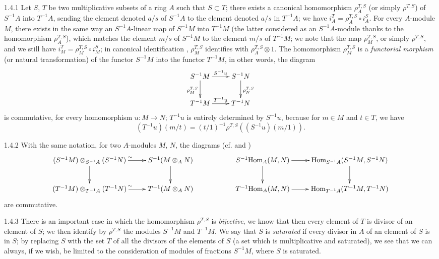 \documentclass[10pt,oneside]{book}
\begin{document}
\begin{env}{1.4.1}
\label{env-0.1.4.1}
Let $S$, $T$ be two multiplicative subsets of a ring $A$ such that $S\subset T$; there exists a canonical
homomorphism $\rho_A^{T,S}$ (or simply $\rho^{T,S}$) of $S^{-1}A$ into  $T^{-1}A$, sending the
element denoted $a/s$ of $S^{-1}A$ to the element denoted $a/s$ in $T^{-1}A$; we have
${i_A^T=\rho_A^{T,S}\circ i_A^S}$. For every $A$-module $M$, there exists in the same way an
$S^{-1}A$-linear map of $S^{-1}M$ into $T^{-1}M$ (the latter considered as an $S^{-1}A$-module thanks
to the homomorphism $\rho_A^{T,S}$), which matches the element $m/s$ of $S^{-1}M$ to the element $m/s$
of $T^{-1}M$; we note that the map $\rho_M^{T,S}$, or simply $\rho^{T,S}$, and we still have
$i_M^T=\rho_M^{T,S}\circ i_M^S$; in canonical identification , $\rho_M^{T,S}$ identifies with
$\rho_A^{T,S}\otimes 1$. The homomorphism $\rho_M^{T,S}$ is a \emph{functorial morphism} (or natural
transformation) of the functor $S^{-1}M$ into the functor $T^{-1}M$, in other words, the diagram
\[
  \xymatrix{
  S^{-1}M\ar[r]^{S^{-1}u}\ar[d]_{\rho_M^{T,S}} & S^{-1}N\ar[d]^{\rho_N^{T,S}}\\
  T^{-1}M\ar[r]^{T^{-1}u} & T^{-1}N
  }
\]
is commutative, for every homomorphism $u:M\to N$; $T^{-1}u$ is entirely determined by
$S^{-1}u$, because for $m\in M$ and $t\in T$, we have
\[
  (T^{-1}u)(m/t)=(t/1)^{-1}\rho^{T,S}((S^{-1}u)(m/1)).
\]
\end{env}

\begin{env}{1.4.2}
\label{env-0.1.4.2}
With the same notation, for two $A$-modules $M$, $N$, the diagrams (cf.  and
)
\[
  \xymatrix{
    (S^{-1}M)\otimes_{S^{-1}A}(S^{-1}N)\ar[r]^\sim \ar[d] & S^{-1}(M\otimes_A N)\ar[d] & &
    S^{-1}\Hom_A(M,N)\ar[r]\ar[d] & \Hom_{S^{-1}A}(S^{-1}M,S^{-1}N)\ar[d]\\
    (T^{-1}M)\otimes_{T^{-1}A}(T^{-1}N)\ar[r]^\sim & T^{-1}(M\otimes_A N) & &
    T^{-1}\Hom_A(M,N)\ar[r] & \Hom_{T^{-1}A}(T^{-1}M,T^{-1}N)
  }
\]
are commutative.
\end{env}

\begin{env}{1.4.3}
\label{env-0.1.4.3}
There is an important case in which the homomorphism $\rho^{T,S}$ is \emph{bijective},
we know that then every element of $T$ is divisor of an element of $S$; we then identify by
$\rho^{T,S}$ the modules $S^{-1}M$ and $T^{-1}M$. We say that $S$ is \emph{saturated} if
every divisor in $A$ of an element of $S$ is in $S$; by replacing $S$ with  the set $T$ of
all the divisors of the elements of $S$ (a set which is multiplicative and saturated), we see
that we can always, if we wish, be limited to the consideration of modules of fractions
$S^{-1}M$, where $S$ is saturated.
\end{env}
\end{document}
